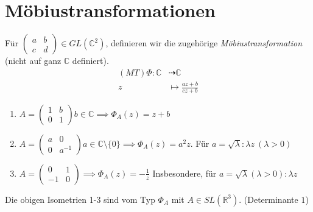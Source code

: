 \documentclass[../main.tex]{subfiles}
\begin{document}
\section{Möbiustransformationen}
\begin{recall}
    Für $\begin{pmatrix}
        a & b \\ c & d
    \end{pmatrix} \in GL(\mathbb{C}^2)$, definieren wir die zugehörige \emph{Möbiustransformation} (nicht auf ganz $\mathbb{C}$ definiert).
    \begin{align*}
        (MT) \Phi : \mathbb{C} & \dashrightarrow \mathbb{C} \\
            z & \mapsto \frac{az+b}{cz+b}
    \end{align*}

\end{recall}

\begin{examples}
    \leavevmode
    \begin{enumerate}
        \item $A = \begin{pmatrix}
            1 & b \\ 0 & 1
        \end{pmatrix} b \in \mathbb{C} \implies \Phi _A (z)=z+b$

        \item $A = \begin{pmatrix}
            a & 0 \\ 0 & a^{-1}
        \end{pmatrix} a \in \mathbb{C}\setminus \{0\} \implies  \Phi _A (z)=a^2z$.
        Für $a = \sqrt{\lambda}: \lambda z \ (\lambda > 0)$

        \item $A = \begin{pmatrix}
            0 & 1 \\ -1 & 0
        \end{pmatrix} \implies \Phi _A (z)= -\frac{1}{z}$
        Insbesondere, für $a = \sqrt{\lambda} (\lambda > 0): \lambda z$
    \end{enumerate}
\end{examples}

\begin{remark}
    Die obigen Isometrien 1-3 sind vom Typ $\Phi _A$ mit $A \in SL(\mathbb{R}^3)$.
    (Determinante $1$)
\end{remark}
\end{document}
